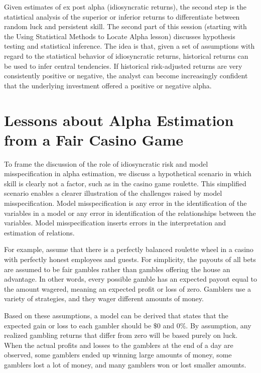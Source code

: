 \documentclass[11pt]{article}
\begin{document}
Given estimates of ex post alpha (idiosyncratic returns), the second step is the statistical analysis of the superior or inferior returns to differentiate between random luck and persistent skill. The second part of this session (starting with the Using Statistical Methods to Locate Alpha lesson) discusses hypothesis testing and statistical inference. The idea is that, given a set of assumptions with regard to the statistical behavior of idiosyncratic returns, historical returns can be used to infer central tendencies. If historical risk-adjusted returns are very consistently positive or negative, the analyst can become increasingly confident that the underlying investment offered a positive or negative alpha.

\section*{Lessons about Alpha Estimation from a Fair Casino Game}
To frame the discussion of the role of idiosyncratic risk and model misspecification in alpha estimation, we discuss a hypothetical scenario in which skill is clearly not a factor, such as in the casino game roulette. This simplified scenario enables a clearer illustration of the challenges raised by model misspecification. Model misspecification is any error in the identification of the variables in a model or any error in identification of the relationships between the variables. Model misspecification inserts errors in the interpretation and estimation of relations.

For example, assume that there is a perfectly balanced roulette wheel in a casino with perfectly honest employees and guests. For simplicity, the payouts of all bets are assumed to be fair gambles rather than gambles offering the house an advantage. In other words, every possible gamble has an expected payout equal to the amount wagered, meaning an expected profit or loss of zero. Gamblers use a variety of strategies, and they wager different amounts of money.

Based on these assumptions, a model can be derived that states that the expected gain or loss to each gambler should be $\$ 0$ and $0 \%$. By assumption, any realized gambling returns that differ from zero will be based purely on luck. When the actual profits and losses to the gamblers at the end of a day are observed, some gamblers ended up winning large amounts of money, some gamblers lost a lot of money, and many gamblers won or lost smaller amounts.
\end{document}
